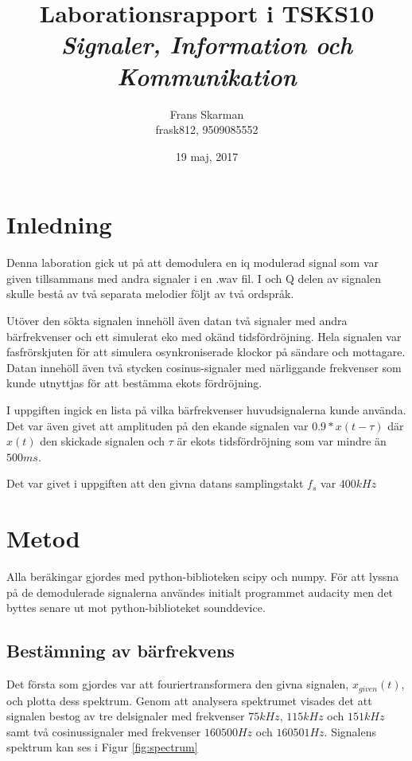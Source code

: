\documentclass[10pt,twocolumn]{article}
\title{Laborationsrapport i TSKS10 \emph{Signaler, Information och Kommunikation}}
\author{Frans Skarman \\ frask812, 9509085552 }
\date{19 maj, 2017}
\newcommand{\echodelay}{\tau}
\begin{document}
\maketitle

\section{Inledning}

Denna laboration gick ut på att demodulera en iq modulerad signal som var given
tillsammans med andra signaler i en .wav fil. I och Q delen av signalen skulle
bestå av två separata melodier följt av två ordspråk.

Utöver den sökta signalen innehöll även datan två signaler med andra bärfrekvenser
och ett simulerat eko med okänd tidsfördröjning. Hela signalen var fasfrörskjuten
för att simulera osynkroniserade klockor på sändare och mottagare. Datan innehöll
även två stycken cosinus-signaler med närliggande frekvenser som kunde utnyttjas för
att bestämma ekots fördröjning.

I uppgiften ingick en lista på vilka bärfrekvenser huvudsignalerna kunde använda.
Det var även givet att amplituden på den ekande signalen var $0.9*x(t-\echodelay)$
där $x(t)$ den skickade signalen och $\echodelay$ är ekots tidsfördröjning som var
mindre än $500ms$.

Det var givet i uppgiften att den givna datans samplingstakt $f_s$ var $400kHz$



\section{Metod}


Alla beräkingar gjordes med python-biblioteken scipy och numpy. För att lyssna på de demodulerade
signalerna användes initialt programmet audacity men det byttes senare ut mot python-biblioteket
sounddevice.

\subsection{Bestämning av bärfrekvens}

Det första som gjordes var att fouriertransformera den givna signalen, $x_{given}(t)$, och plotta
dess spektrum. Genom att analysera spektrumet visades det att signalen bestog av tre
delsignaler med frekvenser $75kHz$, $115kHz$ och $151kHz$ samt två cosinussignaler med 
frekvenser $160500Hz$ och $160501Hz$. Signalens spektrum kan ses i Figur \ref{fig:spectrum}
\end{document}
